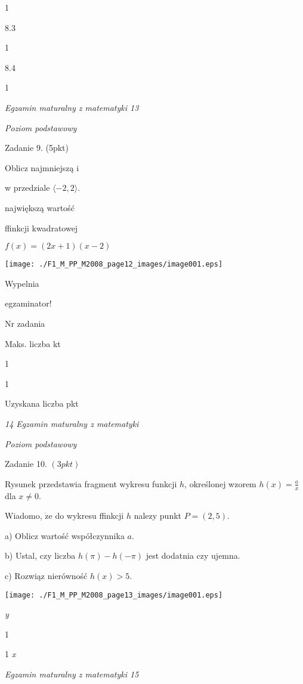 \documentclass[a4paper,12pt]{article}
\begin{document}
1

8.3

1

8.4

1





{\it Egzamin maturalny z matematyki 13}

{\it Poziom podstawowy}

Zadanie 9. (5pkt)

Oblicz najmniejszą i

w przedziale $\langle-2, 2\rangle.$

największą wartość

ffinkcji kwadratowej

$f(x)=(2x+1)(x-2)$
\begin{center}
\texttt{[image: ./F1\_M\_PP\_M2008\_page12\_images/image001.eps]}
\end{center}
Wypelnia

egzaminator!

Nr zadania

Maks. liczba kt

1

1

Uzyskana liczba pkt





{\it 14 Egzamin maturalny z matematyki}

{\it Poziom podstawowy}

Zadanie 10. $(3pkt)$

Rysunek przedstawia fragment wykresu funkcji $h$, określonej wzorem $h(x)=\displaystyle \frac{a}{x}$ dla $x\neq 0.$

Wiadomo, $\dot{\mathrm{z}}\mathrm{e}$ do wykresu ffinkcji $h$ nalezy punkt $P=(2,5).$

a) Oblicz wartość współczynnika $a.$

b) Ustal, czy liczba $h(\pi)-h(-\pi)$ jest dodatnia czy ujemna.

c) Rozwiąz nierówność $h(x)>5.$
\begin{center}
\texttt{[image: ./F1\_M\_PP\_M2008\_page13\_images/image001.eps]}
\end{center}
{\it y}

1

1  {\it x}





{\it Egzamin maturalny z matematyki 15}
\end{document}
